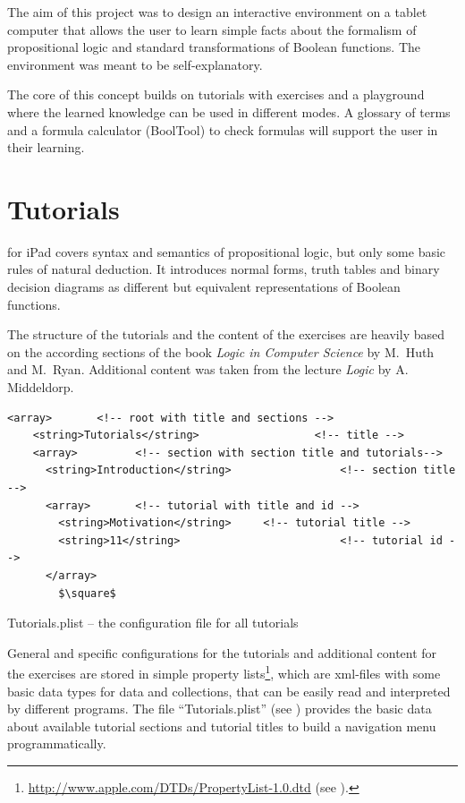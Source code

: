 
The aim of this project was to design an interactive environment on a tablet computer 
that allows the user to learn simple facts about the formalism of propositional logic 
and standard transformations of Boolean functions. 
The environment was meant to be self-explanatory. 

The core of this concept builds on tutorials with exercises 
and a playground where the learned knowledge can be used in different modes. 
A glossary of terms and a formula calculator (BoolTool) to check formulas will support the user in their learning.

\section{Tutorials}

\Nyaya  for iPad covers syntax and semantics of propositional logic, 
but only some basic rules of natural deduction. 
It introduces normal forms, truth tables and binary decision diagrams 
as different but equivalent representations of Boolean functions.

The structure of the tutorials and the content of the exercises are heavily based on the according sections of the book  
{\em Logic in Computer Science} \cite{Huth:2004:LCS:975331} by M.~Huth and M.~Ryan.
Additional content was taken from the lecture {\em Logic} \cite{Middeldorp:2012:LICS} by {A. Middeldorp}.


\begin{table}[htdp]
\begin{center}
\begin{lstlisting}[mathescape,firstnumber=5]
  <array> 		<!-- root with title and sections -->
    <string>Tutorials</string> 					<!-- title -->
    <array>			<!-- section with section title and tutorials-->
      <string>Introduction</string> 				<!-- section title -->
      <array>		<!-- tutorial with title and id -->
        <string>Motivation</string> 	<!-- tutorial title -->
        <string>11</string> 						<!-- tutorial id -->
      </array>
		$\square$
\end{lstlisting}
\caption{Tutorials.plist – the configuration file for all tutorials}
\label{tab:TUTORIALPLIST}
\end{center}
\end{table}%

General and specific configurations for the tutorials and additional content for the exercises 
are stored in simple property lists\footnote{
\href{http://www.apple.com/DTDs/PropertyList-1.0.dtd}{http://www.apple.com/DTDs/PropertyList-1.0.dtd}
(see ). }, 
which are xml-files with some basic data types for data and collections, 
that can be easily read and interpreted by different programs.
The file “Tutorials.plist” (see ) 
provides the basic data about available tutorial sections and tutorial titles 
to build a navigation menu programmatically.

